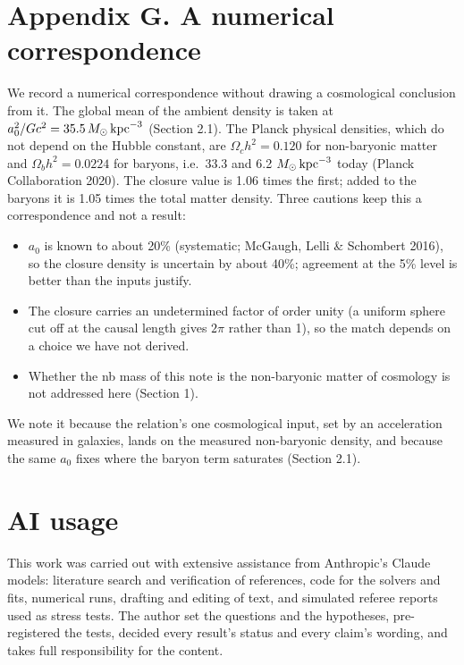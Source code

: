 \documentclass[
  10pt,
]{article}
\begin{document}
\section{Appendix G. A numerical correspondence}\label{appendix-g}

We record a numerical correspondence without drawing a cosmological
conclusion from it. The global mean of the ambient density is taken at
$a_0^2/Gc^2=35.5\,M_\odot\,{\rm kpc}^{-3}$ (Section 2.1). The Planck
physical densities, which do not depend on the Hubble constant, are
$\Omega_ch^2=0.120$ for non-baryonic matter and $\Omega_bh^2=0.0224$ for
baryons, i.e.\ 33.3 and 6.2 $M_\odot\,{\rm kpc}^{-3}$ today (Planck
Collaboration 2020). The closure value is 1.06 times the first; added to
the baryons it is 1.05 times the total matter density. Three cautions keep
this a correspondence and not a result:
\begin{itemize}
\item[(i)] $a_0$ is known to about 20\% (systematic; McGaugh, Lelli \& Schombert 2016), so the closure density is uncertain by about 40\%; agreement at the 5\% level is better than the inputs justify.
\item[(ii)] The closure carries an undetermined factor of order unity (a uniform sphere cut off at the causal length gives $2\pi$ rather than 1), so the match depends on a choice we have not derived.
\item[(iii)] Whether the nb mass of this note is the non-baryonic matter of cosmology is not addressed here (Section 1).
\end{itemize}
We note it because the relation's one cosmological input, set by an acceleration measured in galaxies, lands on the measured non-baryonic density, and because the same $a_0$ fixes where the baryon term saturates (Section 2.1).

\section{AI usage}\label{ai-usage}

This work was carried out with extensive assistance from Anthropic's
Claude models: literature search and verification of references, code
for the solvers and fits, numerical runs, drafting and editing of text,
and simulated referee reports used as stress tests. The author set the
questions and the hypotheses, pre-registered the tests, decided every
result's status and every claim's wording, and takes full responsibility
for the content.
\end{document}
